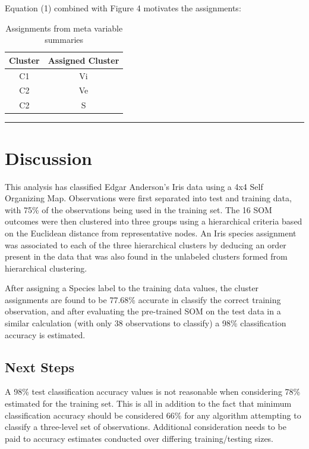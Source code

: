 \documentclass[12pt,]{article}
\begin{document}
Equation (1) combined with Figure 4 motivates the assignments:

\begin{table}[!h]
\begin{center}
\begin{tabular}{|c|c|}
\hline
Cluster & Assigned Cluster\\
\hline
C1 & Vi  \\
\hline
C2 & Ve  \\ 
\hline
C2 & S  \\ 
\hline
\end{tabular}
\end{center}
\caption[Hierarchical Cluster Assignments]{Assignments from meta variable summaries}
\end{table}

\begin{center}\rule{0.5\linewidth}{\linethickness}\end{center}

\newpage

\hypertarget{discussion}{%
\section{Discussion}\label{discussion}}

This analysis has classified Edgar Anderson's Iris data using a 4x4 Self
Organizing Map. Observations were first separated into test and training
data, with 75\% of the observations being used in the training set. The
16 SOM outcomes were then clustered into three groups using a
hierarchical criteria based on the Euclidean distance from
representative nodes. An Iris species assignment was associated to each
of the three hierarchical clusters by deducing an order present in the
data that was also found in the unlabeled clusters formed from
hierarchical clustering.

After assigning a Species label to the training data values, the cluster
assignments are found to be 77.68\% accurate in classify the correct
training observation, and after evaluating the pre-trained SOM on the
test data in a similar calculation (with only 38 observations to
classify) a 98\% classification accuracy is estimated.

\hypertarget{next-steps}{%
\subsection{Next Steps}\label{next-steps}}

A 98\% test classification accuracy values is not reasonable when
considering 78\% estimated for the training set. This is all in addition
to the fact that minimum classification accuracy should be considered
66\% for any algorithm attempting to classify a three-level set of
observations. Additional consideration needs to be paid to accuracy
estimates conducted over differing training/testing sizes.
\end{document}

